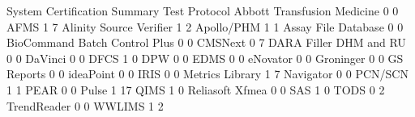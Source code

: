 \documentclass{article}
\begin{document}
\begin{Schunk}
\begin{Soutput}
                                System Certification Summary Test Protocol
  Abbott Transfusion Medicine                              0             0
  AFMS                                                     1             7
  Alinity Source Verifier                                  1             2
  Apollo/PHM                                               1             1
  Assay File Database                                      0             0
  BioCommand Batch Control Plus                            0             0
  CMSNext                                                  0             7
  DARA Filler DHM and RU                                   0             0
  DaVinci                                                  0             0
  DFCS                                                     1             0
  DPW                                                      0             0
  EDMS                                                     0             0
  eNovator                                                 0             0
  Groninger                                                0             0
  GS Reports                                               0             0
  ideaPoint                                                0             0
  IRIS                                                     0             0
  Metrics Library                                          1             7
  Navigator                                                0             0
  PCN/SCN                                                  1             1
  PEAR                                                     0             0
  Pulse                                                    1            17
  QIMS                                                     1             0
  Reliasoft Xfmea                                          0             0
  SAS                                                      1             0
  TODS                                                     0             2
  TrendReader                                              0             0
  WWLIMS                                                   1             2
                               

\end{Soutput}
\end{Schunk}
\end{document}
